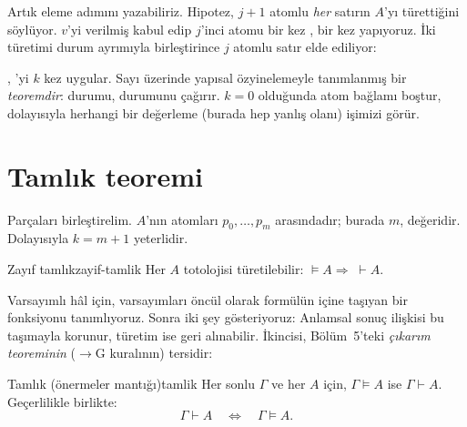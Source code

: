 
\noindent Artık eleme adımını yazabiliriz. Hipotez, $j+1$ atomlu
\emph{her} satırın $A$'yı türettiğini söylüyor. $v$'yi verilmiş kabul
edip $j$'inci atomu bir kez , bir kez  yapıyoruz.
İki türetimi durum ayrımıyla birleştirince $j$ atomlu satır elde ediliyor:


\noindent {}, 'yi $k$ kez uygular. Sayı
üzerinde yapısal özyinelemeyle tanımlanmış bir \emph{teoremdir}:
 durumu,  durumunu çağırır. $k = 0$ olduğunda atom
bağlamı boştur, dolayısıyla herhangi bir değerleme (burada hep yanlış
olanı) işimizi görür.

\section{Tamlık teoremi}\label{sec:tamlik-teoremi}

Parçaları birleştirelim. $A$'nın atomları $p_0, \dots, p_m$
arasındadır; burada $m$,  değeridir. Dolayısıyla
$k = m + 1$ yeterlidir.

\begin{teorem}{Zayıf tamlık}{zayif-tamlik}
Her $A$ totolojisi türetilebilir: $\models A \Rightarrow\; \vdash A$.
\end{teorem}


\noindent Varsayımlı hâl için, varsayımları öncül olarak formülün içine
taşıyan bir  fonksiyonu tanımlıyoruz. Sonra iki şey
gösteriyoruz: Anlamsal sonuç ilişkisi bu taşımayla korunur, türetim ise
geri alınabilir. İkincisi, Bölüm~5'teki \emph{çıkarım teoreminin} ($\to$G
kuralının) tersidir:


\begin{teorem}{Tamlık (önermeler mantığı)}{tamlik}
Her sonlu $\Gamma$ ve her $A$ için, $\Gamma \models A$ ise $\Gamma
\vdash A$. Geçerlilikle birlikte:
\[
  \Gamma \vdash A \quad\Longleftrightarrow\quad \Gamma \models A .
\]
\end{teorem}


